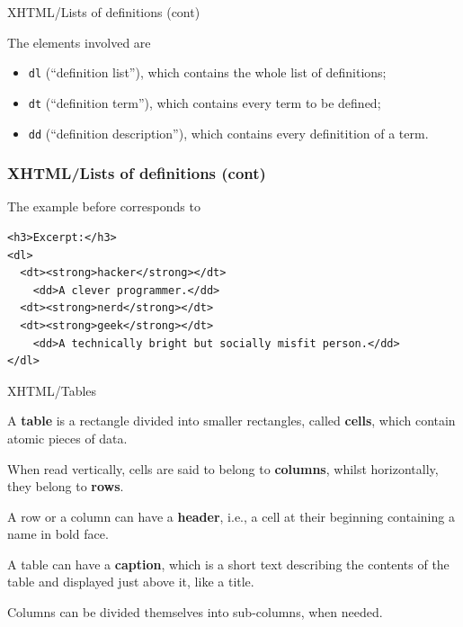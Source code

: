 %
\begin{frame}{XHTML/Lists of definitions (cont)}

The elements involved are
\begin{itemize}

  \item \texttt{dl} (``definition list''), which contains the whole
    list of definitions;

  \item \texttt{dt} (``definition term''), which contains every term
    to be defined;

  \item \texttt{dd} (``definition description''), which contains every
    definitition of a term.

\end{itemize}

\end{frame}

%
\begin{frame}[containsverbatim]
\frametitle{XHTML/Lists of definitions (cont)}

The example before corresponds to
{\small
\begin{verbatim}
<h3>Excerpt:</h3>
<dl>
  <dt><strong>hacker</strong></dt>
    <dd>A clever programmer.</dd>
  <dt><strong>nerd</strong></dt>
  <dt><strong>geek</strong></dt>
    <dd>A technically bright but socially misfit person.</dd>
</dl>
\end{verbatim}
}

\end{frame}

%
\begin{frame}{XHTML/Tables}

A \textbf{table} is a rectangle divided into smaller rectangles,
called \textbf{cells}, which contain atomic pieces of data.

\bigskip

When read vertically, cells are said to belong to \textbf{columns},
whilst horizontally, they belong to \textbf{rows}.

\bigskip

A row or a column can have a \textbf{header}, i.e., a cell at their
beginning containing a name in bold face.

\bigskip

A table can have a \textbf{caption}, which is a short text describing
the contents of the table and displayed just above it, like a title.

\bigskip

Columns can be divided themselves into sub-columns, when needed.

\end{frame}


